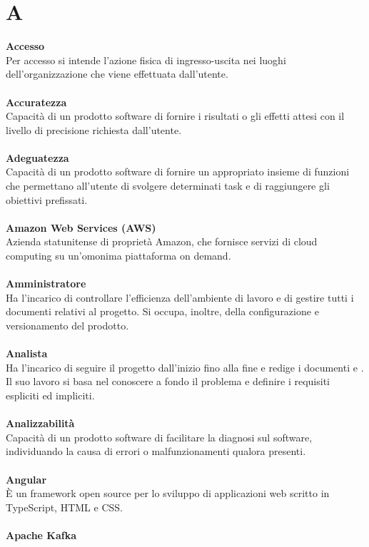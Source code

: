 \section{A}
\textbf{Accesso}\\ 
Per accesso si intende l'azione fisica di ingresso-uscita nei luoghi dell'organizzazione che viene effettuata dall'utente.\\ \\
\textbf{Accuratezza}\\
Capacità di un prodotto software di fornire i risultati o gli effetti attesi con il livello di precisione richiesta
dall'utente.\\ \\
\textbf{Adeguatezza}\\
Capacità di un prodotto software di fornire un appropriato insieme di funzioni che permettano all'utente di svolgere determinati task e di raggiungere gli obiettivi prefissati.\\ \\
\textbf{Amazon Web Services (AWS)}\\
Azienda statunitense di proprietà Amazon, che fornisce servizi di cloud computing su un'omonima piattaforma on demand. \\ \\
\textbf{Amministratore}\\
Ha l'incarico di controllare l'efficienza dell'ambiente di lavoro e di gestire tutti i documenti relativi al progetto. Si occupa, inoltre, della configurazione e versionamento del prodotto.\\ \\
\textbf{Analista}\\
Ha l'incarico di seguire il progetto dall'inizio fino alla fine e redige i documenti \SdF{} e \AdR{}. Il suo lavoro si basa nel conoscere a fondo il problema e definire i requisiti espliciti ed impliciti.\\ \\
\textbf{Analizzabilità}\\
Capacità di un prodotto software di facilitare la diagnosi sul software, individuando la causa di errori o malfunzionamenti qualora presenti.\\ \\
\textbf{Angular}\\
È un framework open source per lo sviluppo di applicazioni web scritto in TypeScript, HTML e CSS. \\ \\
\textbf{Apache Kafka}\\
